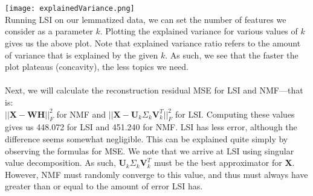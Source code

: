 \documentclass[11pt]{article}
\begin{document}
\begin{multicols}{2}
\\\\
\texttt{[image: explainedVariance.png]}\\
Running LSI on our lemmatized data, we can set the number of features we consider as a parameter $k$. Plotting the explained variance for various values of $k$ gives us the above plot. Note that explained variance ratio refers to the amount of variance that is explained by the given $k$. As such, we see that the faster the plot plateaus (concavity), the less topics we need. \\\\
Next, we will calculate the reconstruction residual MSE for LSI and NMF—that is: \\$||\textbf{X}-\textbf{WH}||^2_F$ for NMF and $||\textbf{X}-\textbf{U}_k\Sigma_k\textbf{V}_k^T||^2_F$ for LSI. Computing these values gives us 448.072 for LSI and 451.240 for NMF. LSI has less error, although the difference seems somewhat negligible. This can be explained quite simply by observing the formulas for MSE. We note that we arrive at LSI using singular value decomposition. As such, $\textbf{U}_k\Sigma_k\textbf{V}_k^T$ must be the best approximator for $\textbf{X}$. However, NMF must randomly converge to this value, and thus must always have greater than or equal to the amount of error LSI has. 

\end{multicols}
\end{document}

